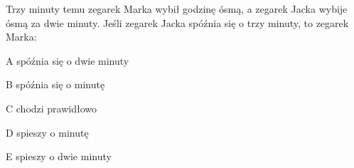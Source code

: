 \begin{tresc}
Trzy minuty temu zegarek Marka wybił godzinę ósmą, a zegarek Jacka wybije ósmą za dwie minuty. Jeśli zegarek Jacka spóźnia się o trzy minuty, to zegarek Marka:
\end{tresc}
\begin{wariant}{A} spóźnia się o dwie minuty \end{wariant}
\begin{wariant}{B} spóźnia się o minutę \end{wariant}
\begin{wariant}{C} chodzi prawidłowo \end{wariant}
\begin{wariant}{D} spieszy o minutę \end{wariant}
\begin{wariant}{E} spieszy o dwie minuty \end{wariant}
